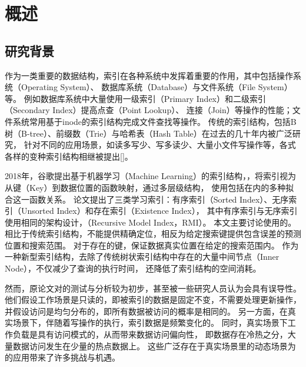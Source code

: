 
\chapter{概述}
\label{chap:intro}

\section{研究背景}

作为一类重要的数据结构，索引在各种系统中发挥着重要的作用，其中包括操作系统（Operating System）、
数据库系统（Database）与文件系统（File System）等。
例如数据库系统中大量使用一级索引（Primary Index）和二级索引（Secondary Index）提高点查（Point Lookup）、
连接（Join）等操作的性能；文件系统常用基于inode的索引结构完成文件查找等操作。
传统的索引结构，包括B树（B-tree）、前缀数（Trie）与哈希表（Hash Table）在过去的几〸年内被广泛研究，
针对不同的应用场景，如读多写少、写多读少、大量小文件写操作等，各式各样的变种索引结构相继被提出[]。

2018年，谷歌提出基于机器学习（Machine Learning）的索引结构，{\li}\cite{kraska2018case}，将索引视为从键（Key）到数据位置的函数映射，通过多层级{\model}结构，
使用包括{\nn}在内的多种{\model}拟合这一函数关系。
论文提出了三类学习索引：有序索引（Sorted Index）、无序索引（Unsorted Index）和存在索引（Existence Index），
其中有序索引与无序索引使用相同的架构设计，{\rmi}（Recursive Model Index，RMI）。
本文主要讨论使用{\rmi}的{\li}。
相比于传统索引结构，{\li}不能提供精确定位，相反{\li}为给定搜索键提供包含误差的预测位置和搜索范围。
对于存在的键，{\li}保证数据真实位置在给定的搜索范围内。
作为一种新型索引结构，{\li}去除了传统树状索引结构中存在的大量中间节点（Inner Node），不仅减少了查询的执行时间，
还降低了索引结构的空间消耗。

然而，原论文\cite{kraska2018case}对{\li}的测试与分析较为初步，甚至被一些研究人员认为会具有误导性\cite{throwalgo}。
他们假设工作场景是只读的，即被索引的数据是固定不变，{\li}不需要处理更新操作，并假设访问是均匀分布的，即所有数据被访问的概率是相同的。
另一方面，在真实场景下，伴随着写操作的执行，索引数据是频繁变化的\cite{tpcc}。
同时，真实场景下工作负载是具有访问模式的，从而带来数据访问偏向性\cite{zhang2016reducing, debrabant2013anti, eldawy2014trekking, levandoski2013identifying}，
即数据存在冷热之分，大量数据访问发生在少量的热点数据上。
这些广泛存在于真实场景里的动态场景为{\li}的应用带来了许多挑战与机遇。


